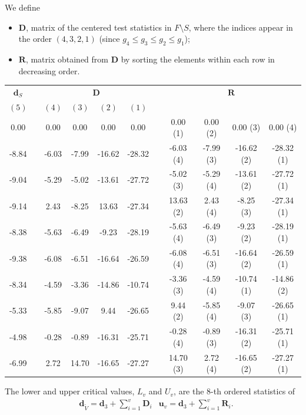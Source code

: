 \documentclass[11pt,a4paper,openright,twoside]{article}
\begin{document}
We define
\begin{itemize}
\item $\mathbf{D}$, matrix of the centered test statistics in $F\setminus S$, where the indices appear in the order $(4,3,2,1)$ (since $g_4\leq g_3\leq g_2\leq g_1$);
\item $\mathbf{R}$, matrix obtained from $\mathbf{D}$ by sorting the elements within each row in decreasing order.
\end{itemize}

\newpage
\begin{table}[h!]
\centering
\begin{tabular}{ccccccccccc}
$\mathbf{d}_S$ & & \multicolumn{4}{c}{$\mathbf{D}$} & & \multicolumn{4}{c}{$\mathbf{R}$}\\
$(5)$ &  & $(4)$ & $(3)$ & $(2)$ & $(1)$ &  &  &  &  &  \\
\cline{1-1} \cline{3-6} \cline{8-11}
0.00 &  & 0.00 & 0.00 & 0.00 & 0.00 &  & 0.00 (1)& 0.00 (2)& 0.00 (3)& 0.00 (4)\\
-8.84 &  & -6.03 & -7.99 & -16.62 & -28.32 &  & -6.03 (4)& -7.99 (3)& -16.62 (2)& -28.32 (1)\\
-9.04 &  & -5.29 & -5.02 & -13.61 & -27.72 &  & -5.02 (3)& -5.29 (4)& -13.61 (2)& -27.72 (1)\\
-9.14 &  & 2.43 & -8.25 & 13.63 & -27.34 &  & 13.63 (2)& 2.43 (4)& -8.25 (3)& -27.34 (1)\\
-8.38 &  & -5.63 & -6.49 & -9.23 & -28.19 &  & -5.63 (4)& -6.49 (3)& -9.23 (2)& -28.19 (1)\\
-9.38 &  & -6.08 & -6.51 & -16.64 & -26.59 &  & -6.08 (4)& -6.51 (3)& -16.64 (2)& -26.59 (1)\\
-8.34 &  & -4.59 & -3.36 & -14.86 & -10.74 &  & -3.36 (3)& -4.59 (4)& -10.74 (1)& -14.86 (2)\\
-5.33 &  & -5.85 & -9.07 & 9.44 & -26.65 &  & 9.44 (2)& -5.85 (4)& -9.07 (3)& -26.65 (1)\\
-4.98 &  & -0.28 & -0.89 & -16.31 & -25.71 &  & -0.28 (4)& -0.89 (3)& -16.31 (2)& -25.71 (1)\\
-6.99 &  & 2.72 & 14.70 & -16.65 & -27.27 &  & 14.70 (3)& 2.72 (4)& -16.65 (2) & -27.27 (1)
\end{tabular}
\end{table}

The lower and upper critical values, $L_v$ and $U_v$, are the 8-th ordered statistics of
\begin{align*}
& \mathbf{d}_{\tilde{V}}=\mathbf{d}_3 + \sum_{i=1}^v \mathbf{D}_i & \mathbf{u}_v=\mathbf{d}_3 + \sum_{i=1}^v \mathbf{R}_i.
\end{align*}
\end{document}
